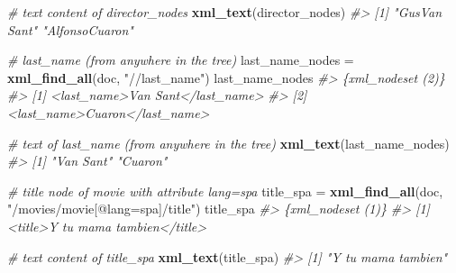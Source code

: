 \documentclass[
]{book}
\newenvironment{Shaded}{\begin{snugshade}}{\end{snugshade}}
\newcommand{\CommentTok}[1]{\textcolor[rgb]{0.56,0.35,0.01}{\textit{#1}}}
\newcommand{\FunctionTok}[1]{\textcolor[rgb]{0.13,0.29,0.53}{\textbf{#1}}}
\newcommand{\NormalTok}[1]{#1}
\newcommand{\OtherTok}[1]{\textcolor[rgb]{0.56,0.35,0.01}{#1}}
\newcommand{\StringTok}[1]{\textcolor[rgb]{0.31,0.60,0.02}{#1}}
\begin{document}
\begin{Shaded}
\begin{Highlighting}[]
\CommentTok{\# text content of director\_nodes}
\FunctionTok{xml\_text}\NormalTok{(director\_nodes)}
\CommentTok{\#\textgreater{} [1] "GusVan Sant"   "AlfonsoCuaron"}
\end{Highlighting}
\end{Shaded}

\begin{Shaded}
\begin{Highlighting}[]
\CommentTok{\# last\_name (from anywhere in the tree)}
\NormalTok{last\_name\_nodes }\OtherTok{=} \FunctionTok{xml\_find\_all}\NormalTok{(doc, }\StringTok{"//last\_name"}\NormalTok{)}
\NormalTok{last\_name\_nodes}
\CommentTok{\#\textgreater{} \{xml\_nodeset (2)\}}
\CommentTok{\#\textgreater{} [1] \textless{}last\_name\textgreater{}Van Sant\textless{}/last\_name\textgreater{}}
\CommentTok{\#\textgreater{} [2] \textless{}last\_name\textgreater{}Cuaron\textless{}/last\_name\textgreater{}}
\end{Highlighting}
\end{Shaded}

\begin{Shaded}
\begin{Highlighting}[]
\CommentTok{\# text of last\_name (from anywhere in the tree)}
\FunctionTok{xml\_text}\NormalTok{(last\_name\_nodes)}
\CommentTok{\#\textgreater{} [1] "Van Sant" "Cuaron"}
\end{Highlighting}
\end{Shaded}

\begin{Shaded}
\begin{Highlighting}[]
\CommentTok{\# title node of movie with attribute lang=\textquotesingle{}spa\textquotesingle{}}
\NormalTok{title\_spa }\OtherTok{=} \FunctionTok{xml\_find\_all}\NormalTok{(doc, }\StringTok{"/movies/movie[@lang=\textquotesingle{}spa\textquotesingle{}]/title"}\NormalTok{)}
\NormalTok{title\_spa}
\CommentTok{\#\textgreater{} \{xml\_nodeset (1)\}}
\CommentTok{\#\textgreater{} [1] \textless{}title\textgreater{}Y tu mama tambien\textless{}/title\textgreater{}}
\end{Highlighting}
\end{Shaded}

\begin{Shaded}
\begin{Highlighting}[]
\CommentTok{\# text content of title\_spa}
\FunctionTok{xml\_text}\NormalTok{(title\_spa)}
\CommentTok{\#\textgreater{} [1] "Y tu mama tambien"}
\end{Highlighting}
\end{Shaded}
\end{document}
